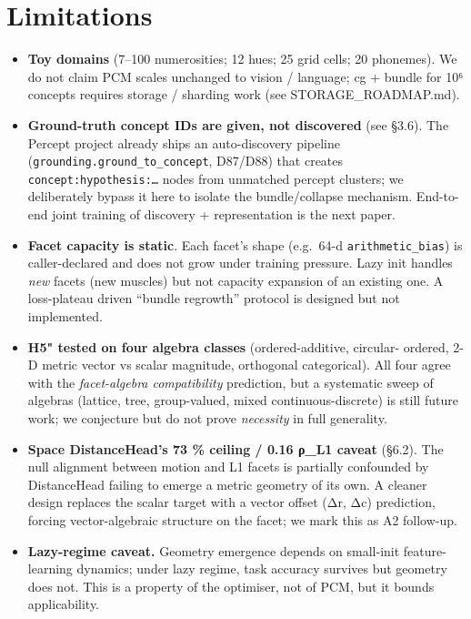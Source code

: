 \medskip

\section{Limitations}

\begin{itemize}
\tightlist
\item
  \textbf{Toy domains} (7--100 numerosities; 12 hues; 25 grid cells; 20
  phonemes). We do not claim PCM scales unchanged to vision /
  language; cg + bundle for 10⁶ concepts requires storage / sharding
  work (see STORAGE\_ROADMAP.md).
\item
  \textbf{Ground-truth concept IDs are given, not discovered} (see §3.6).
  The Percept project already ships an auto-discovery pipeline
  (\texttt{grounding.ground\_to\_concept}, D87/D88) that creates
  \texttt{concept:hypothesis:\ldots{}} nodes from unmatched percept clusters; we
  deliberately bypass it here to isolate the bundle/collapse
  mechanism. End-to-end joint training of discovery + representation
  is the next paper.
\item
  \textbf{Facet capacity is static}. Each facet's shape (e.g.~64-d
  \texttt{arithmetic\_bias}) is caller-declared and does not grow under
  training pressure. Lazy init handles \emph{new} facets (new muscles) but
  not capacity expansion of an existing one. A loss-plateau driven
  ``bundle regrowth'' protocol is designed but not implemented.
\item
  \textbf{H5" tested on four algebra classes} (ordered-additive, circular-
  ordered, 2-D metric vector vs scalar magnitude, orthogonal
  categorical). All four agree with the \emph{facet-algebra compatibility}
  prediction, but a systematic sweep of algebras (lattice, tree,
  group-valued, mixed continuous-discrete) is still future work; we
  conjecture but do not prove \emph{necessity} in full generality.
\item
  \textbf{Space DistanceHead's 73 \% ceiling / 0.16 ρ\_L1 caveat} (§6.2).
  The null alignment between motion and L1 facets is partially
  confounded by DistanceHead failing to emerge a metric geometry of
  its own. A cleaner design replaces the scalar target with a
  vector offset (Δr, Δc) prediction, forcing vector-algebraic
  structure on the facet; we mark this as A2 follow-up.
\item
  \textbf{Lazy-regime caveat.} Geometry emergence depends on small-init
  feature-learning dynamics; under lazy regime, task accuracy survives
  but geometry does not. This is a property of the optimiser, not of
  PCM, but it bounds applicability.
\end{itemize}

